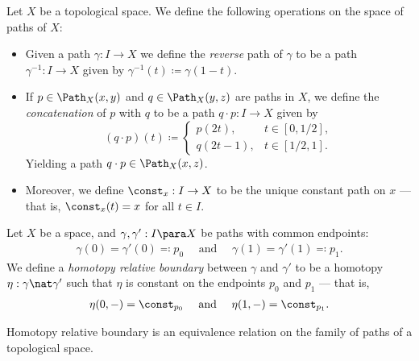 \begin{definition}
\label{def:operations-paths}
Let \(X\) be a topological space. We define the following operations on the
space of paths of \(X\):
\begin{itemize}\setlength\itemsep{0em}
\item Given a path \(\gamma: I \to X\) we define the \emph{reverse} path of
  \(\gamma\) to be a path \(\gamma^{-1}: I \to X\) given by
  \(\gamma^{-1}(t) \coloneq \gamma(1 - t)\).

\item If \(p \in \Path_X(x, y)\) and \(q \in \Path_X(y, z)\) are paths in \(X\),
  we define the \emph{concatenation} of \(p\) with \(q\) to be a path \(q \cdot
  p: I \to X\) given by
  \[
  (q \cdot p)(t) \coloneq
  \begin{cases}
    p(2 t), &t \in [0, 1/2], \\
    q(2 t - 1), &t \in [1/2, 1].
  \end{cases}
  \]
  Yielding a path \(q \cdot p \in \Path_X(x, z)\).

\item Moreover, we define \(\const_x: I \to X\) to be the unique constant path
  on \(x\) --- that is, \(\const_x(t) = x\) for all \(t \in I\).
\end{itemize}
\end{definition}

\begin{definition}
\label{def:htpy-relative-boundary}
Let \(X\) be a space, and \(\gamma, \gamma': I \para X\) be paths with common
endpoints:
\begin{align*}
 \gamma(0) = \gamma'(0) \eqqcolon p_0\quad \text{ and }\quad
 \gamma(1) = \gamma'(1) \eqqcolon p_1.
\end{align*}
We define a \emph{homotopy relative boundary} between \(\gamma\) and \(\gamma'\)
to be a homotopy \(\eta: \gamma \nat \gamma'\) such that \(\eta\) is constant on
the endpoints \(p_0\) and \(p_1\) --- that is,
\begin{align*}
  \eta(0, -) = \const_{p_0}\quad \text{ and }\quad \eta(1, -) = \const_{p_1}.
\end{align*}
\end{definition}

\begin{proposition}
\label{prop:htpy-rel-boundary-is-equiv-relation}
Homotopy relative boundary is an equivalence relation on the family of paths of
a topological space.
\end{proposition}

